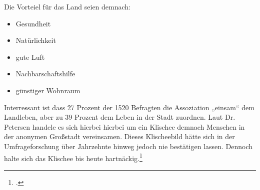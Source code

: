 \documentclass{scrartcl}
\begin{document}
Die Vorteiel für das Land seien demnach:

\begin{itemize}
    \item Gesundheit
    \item Natürlichkeit
    \item gute Luft
    \item Nachbarschaftshilfe
    \item günstiger Wohnraum
\end{itemize}

Interressant ist dass 27 Prozent der 1520 Befragten die Assoziation „einsam“ dem Landleben, aber zu 39 Prozent dem Leben in der Stadt zuordnen. Laut Dr. Petersen handele es sich hierbei hierbei um ein Klischee demnach Menschen in der anonymen Großstadt vereinsamen. Dieses Klischeebild hätte sich in der Umfrageforschung über Jahrzehnte hinweg jedoch nie bestätigen lassen. Dennoch halte sich das Klischee bis heute hartnäckig.\footcite[Vgl.][S. 7ff]{Dr.ThomasPetersen2014DieLandlichkeit}
\end{document}
